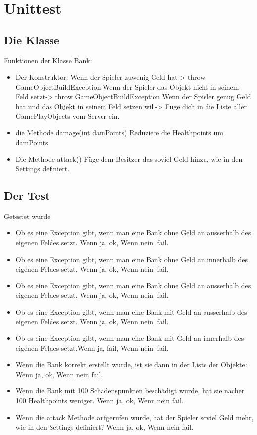 \documentclass[ngerman, 12pt, pdftex]{scrartcl}[2006/07/30]
\begin{document}
\section{Unittest}
\subsection{Die Klasse}
Funktionen der Klasse Bank:
\begin{itemize}
\item Der Konstruktor: 
\subitem Wenn der Spieler zuwenig Geld hat-> throw GameObjectBuildException
\subitem Wenn der Spieler das Objekt nicht in seinem Feld setzt-> throw GameObjectBuildException
\subitem Wenn der Spieler genug Geld hat und das Objekt in seinem Feld setzen will-> F\"{u}ge dich in die Liste aller GamePlayObjects vom Server ein.
\item die Methode damage(int damPoints)
\subitem Reduziere die Healthpoints um damPoints
\item Die Methode attack()
\subitem F\"{u}ge dem Besitzer das soviel Geld hinzu, wie in den Settings definiert.
\end{itemize}

\subsection{Der Test}
Getestet wurde:
\begin{itemize}
\item Ob es eine Exception gibt, wenn man eine Bank ohne Geld an ausserhalb des eigenen Feldes setzt. Wenn ja, ok, Wenn nein, fail.
\item Ob es eine Exception gibt, wenn man eine Bank ohne Geld an innerhalb des eigenen Feldes setzt. Wenn ja, ok, Wenn nein, fail.
\item Ob es eine Exception gibt, wenn man eine Bank ohne Geld an ausserhalb des eigenen Feldes setzt. Wenn ja, ok, Wenn nein, fail.
\item Ob es eine Exception gibt, wenn man eine Bank mit Geld an ausserhalb des eigenen Feldes setzt. Wenn ja, ok, Wenn nein, fail.
\item Ob es eine Exception gibt, wenn man eine Bank mit Geld an innerhalb des eigenen Feldes setzt.Wenn ja, fail, Wenn nein, fail.
\item Wenn die Bank korrekt erstellt wurde, ist sie dann in der Liste der Objekte: Wenn ja, ok, Wenn nein fail.
\item Wenn die Bank mit 100 Schadenspunkten besch\"{a}digt wurde, hat sie nacher 100 Healthpoints weniger. Wenn ja, ok, Wenn nein fail.
\item Wenn die attack Methode aufgerufen wurde, hat der Spieler soviel Geld mehr, wie in den Settings definiert? Wenn ja, ok, Wenn nein fail.
\end{itemize}

 
\end{document}
